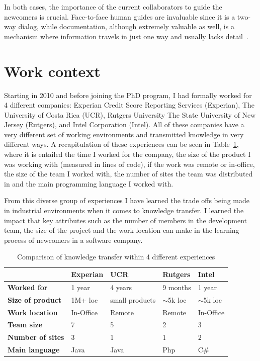\documentclass[12pt, letterpaper]{article}
\begin{document}
In both cases, the importance of the current collaborators to guide the newcomers is crucial.
Face-to-face human guides are invaluable since it is a two-way dialog, while documentation,
although extremely valuable as well, is a mechanism
where information travels in just one way and usually lacks detail~\cite{Dagenais10}.
 
\section{Work context}
Starting in 2010 and before joining the PhD program, I had formally worked for 4 different companies: Experian Credit 
Score Reporting Services (Experian), The University of Costa Rica (UCR), Rutgers University The State University of New 
Jersey (Rutgers), and Intel Corporation (Intel). All of these companies 
have a very different set of working environments and transmitted knowledge in very different ways. A recapitulation of
these experiences can be seen in Table~\ref{comparisonTable}, where it is entailed the time I worked for the company, the 
size of the product I was working with (measured in lines of code), if the work was remote or in-office, the size of the 
team I worked with, the number of sites the team was distributed in and the main programming language I worked with.

From this diverse group of experiences I have learned the trade offs being made in industrial environments
when it comes to knowledge transfer. I learned the impact that key attributes such as the number of members in the 
development team, the size of the project and the work location can make in the learning process of newcomers in a
software company. 

\begin{table}[] 
\centering
\caption{Comparison of knowledge transfer within 4 different experiences}
\label{comparisonTable}
\begin{tabular}{|l|l|l|l|l|}
\hline
                         & \textbf{Experian} & \textbf{UCR}   & \textbf{Rutgers} & \textbf{Intel} \\ \hline
\textbf{Worked for}      & 1 year            & 4 years        & 9 months         & 1 year         \\ \hline
\textbf{Size of product} & 1M+ loc           & small products & $\sim$5k loc     & $\sim$5k loc   \\ \hline
\textbf{Work location}   & In-Office         & Remote         & Remote           & In-Office      \\ \hline
\textbf{Team size}       & 7                 & 5              & 2                & 3              \\ \hline
\textbf{Number of sites} & 3                 & 1              & 1                & 2              \\ \hline
\textbf{Main language}   & Java              & Java           & Php              & C\#            \\ \hline
\end{tabular}
\end{table}
\end{document}

